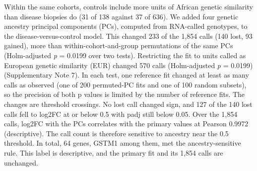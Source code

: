 Within the same cohorts, controls include more units of African genetic similarity than disease biopsies do (31 of 138 against 37 of 636). We added four genetic ancestry principal components (PCs), computed from RNA-called genotypes, to the disease-versus-control model. This changed 233 of the 1,854 calls (140 lost, 93 gained), more than within-cohort-and-group permutations of the same PCs (Holm-adjusted \emph{p} = 0.0199 over two tests). Restricting the fit to units called as European genetic similarity (EUR) changed 570 calls (Holm-adjusted \emph{p} = 0.0199) (Supplementary Note 7). In each test, one reference fit changed at least as many calls as observed (one of 200 permuted-PC fits and one of 100 random subsets), so the precision of both p values is limited by the number of reference fits. The changes are threshold crossings. No lost call changed sign, and 127 of the 140 lost calls fell to \textbar log2FC\textbar{} at or below 0.5 with padj still below 0.05. Over the 1,854 calls, log2FC with the PCs correlates with the primary values at Pearson 0.9972 (descriptive). The call count is therefore sensitive to ancestry near the 0.5 threshold. In total, 64 genes, GSTM1 among them, met the ancestry-sensitive rule. This label is descriptive, and the primary fit and its 1,854 calls are unchanged.

